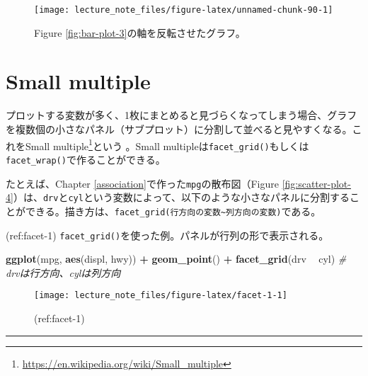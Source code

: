 \documentclass[]{book}
\newenvironment{Shaded}{\begin{snugshade}}{\end{snugshade}}
\newcommand{\KeywordTok}[1]{\textcolor[rgb]{0.13,0.29,0.53}{\textbf{#1}}}
\newcommand{\StringTok}[1]{\textcolor[rgb]{0.31,0.60,0.02}{#1}}
\newcommand{\CommentTok}[1]{\textcolor[rgb]{0.56,0.35,0.01}{\textit{#1}}}
\newcommand{\OperatorTok}[1]{\textcolor[rgb]{0.81,0.36,0.00}{\textbf{#1}}}
\newcommand{\NormalTok}[1]{#1}
\let\rmarkdownfootnote\footnote%
\def\footnote{\protect\rmarkdownfootnote}
\begin{document}
\begin{figure}

{\centering \texttt{[image: lecture\_note\_files/figure-latex/unnamed-chunk-90-1]} 

}

\caption{Figure \ref{fig:bar-plot-3}の軸を反転させたグラフ。}\label{fig:unnamed-chunk-90}
\end{figure}

\section{Small multiple}\label{small-multiple}

プロットする変数が多く、1枚にまとめると見づらくなってしまう場合、グラフを複数個の小さなパネル（サブプロット）に分割して並べると見やすくなる。これをSmall
multiple\footnote{\url{https://en.wikipedia.org/wiki/Small_multiple}}という
。Small
multipleは\texttt{facet\_grid()}もしくは\texttt{facet\_wrap()}で作ることができる。

たとえば、Chapter \ref{association}で作った\texttt{mpg}の散布図（Figure
\ref{fig:scatter-plot-4}）は、\texttt{drv}と\texttt{cyl}という変数によって、以下のような小さなパネルに分割することができる。描き方は、\texttt{facet\_grid(行方向の変数\textasciitilde{}列方向の変数)}である。

(ref:facet-1)
\texttt{facet\_grid()}を使った例。パネルが行列の形で表示される。

\begin{Shaded}
\begin{Highlighting}[]
\KeywordTok{ggplot}\NormalTok{(mpg, }\KeywordTok{aes}\NormalTok{(displ, hwy)) }\OperatorTok{+}
\StringTok{  }\KeywordTok{geom_point}\NormalTok{() }\OperatorTok{+}
\StringTok{  }\KeywordTok{facet_grid}\NormalTok{(drv }\OperatorTok{~}\StringTok{ }\NormalTok{cyl) }\CommentTok{# drvは行方向、cylは列方向}
\end{Highlighting}
\end{Shaded}

\begin{figure}

{\centering \texttt{[image: lecture\_note\_files/figure-latex/facet-1-1]} 

}

\caption{(ref:facet-1)}\label{fig:facet-1}
\end{figure}

\begin{center}\rule{0.5\linewidth}{\linethickness}\end{center}
\end{document}
